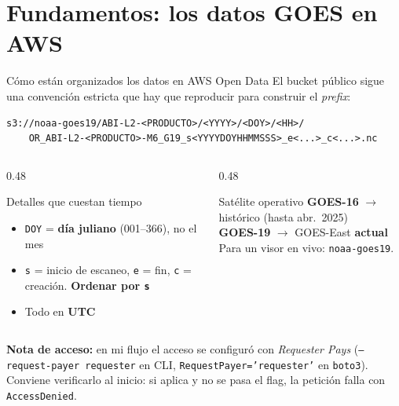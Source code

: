 \documentclass[10pt,aspectratio=169]{beamer}
\begin{document}
\section{Fundamentos: los datos GOES en AWS}

\begin{frame}[fragile]{Cómo están organizados los datos en AWS Open Data}
  El bucket público sigue una convención estricta que hay que reproducir
  para construir el \emph{prefix}:

\begin{lstlisting}
s3://noaa-goes19/ABI-L2-<PRODUCTO>/<YYYY>/<DOY>/<HH>/
    OR_ABI-L2-<PRODUCTO>-M6_G19_s<YYYYDOYHHMMSSS>_e<...>_c<...>.nc
\end{lstlisting}

  \begin{columns}[T]
    \begin{column}{0.48\textwidth}
      \begin{block}{Detalles que cuestan tiempo}
        \small
        \begin{itemize}\small
          \item \texttt{DOY} = \textbf{día juliano} (001--366), no el mes
          \item \texttt{s} = inicio de escaneo, \texttt{e} = fin,
                \texttt{c} = creación. \textbf{Ordenar por \texttt{s}}
          \item Todo en \textbf{UTC}
        \end{itemize}
      \end{block}
    \end{column}
    \begin{column}{0.48\textwidth}
      \begin{block}{Satélite operativo}
        \small
        \textbf{GOES-16} $\to$ histórico (hasta abr.\ 2025)\\
        \textbf{GOES-19} $\to$ GOES-East \textbf{actual}\\[0.2em]
        Para un visor en vivo: \texttt{noaa-goes19}.
      \end{block}
    \end{column}
  \end{columns}

  \vspace{0.3em}
  \footnotesize
  \textbf{Nota de acceso:} en mi flujo el acceso se configuró con
  \emph{Requester Pays} (\texttt{--request-payer requester} en CLI,
  \texttt{RequestPayer='requester'} en \texttt{boto3}). Conviene verificarlo al
  inicio: si aplica y no se pasa el flag, la petición falla con
  \texttt{AccessDenied}.
\end{frame}
\end{document}
